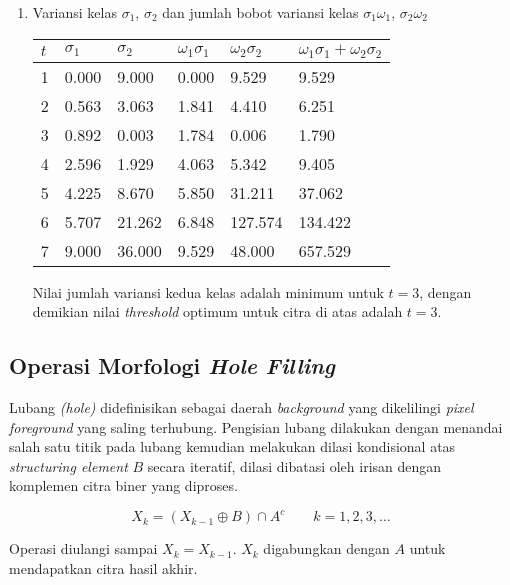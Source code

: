 \documentclass[laporan.tex]{subfiles}
\begin{document}
\begin{enumerate}
\item Variansi kelas $\sigma_1$, $\sigma_2$ dan jumlah bobot variansi kelas $\sigma_1 \omega_1$, $\sigma_2 \omega_2$ \\
\begin{tabular}{|l|l|l|l|l|l|}
\hline
$t$ & $\sigma_1$ & $\sigma_2$ & $\omega_1 \sigma_1$ & $\omega_2 \sigma_2$ & $\omega_1 \sigma_1 + \omega_2 \sigma_2$ \\
\hline
1 & 0.000 & 9.000 & 0.000 & 9.529 & 9.529 \\
2 & 0.563 & 3.063 & 1.841 & 4.410 & 6.251 \\
3 & 0.892 & 0.003 & 1.784 & 0.006 & 1.790 \\
4 & 2.596 & 1.929 & 4.063 & 5.342 & 9.405 \\
5 & 4.225 & 8.670 & 5.850 & 31.211 & 37.062 \\
6 & 5.707 & 21.262 & 6.848 & 127.574 & 134.422 \\
7 & 9.000 & 36.000 & 9.529 & 48.000 & 657.529 \\
\hline
\end{tabular}

Nilai jumlah variansi kedua kelas adalah minimum untuk $t=3$, dengan demikian nilai \emph{threshold} optimum untuk citra di atas adalah $t=3$.

\end{enumerate}

\FloatBarrier

\subsection{Operasi Morfologi \emph{Hole Filling}}

Lubang \emph{(hole)} didefinisikan sebagai daerah \emph{background} yang dikelilingi \emph{pixel} \emph{foreground} yang saling terhubung. Pengisian lubang dilakukan dengan menandai salah satu titik pada lubang kemudian melakukan dilasi kondisional atas \emph{structuring element} $B$ secara iteratif, dilasi dibatasi oleh irisan dengan komplemen citra biner yang diproses.

\begin{equation}
X_k = (X_{k-1} \oplus B) \cap A^c \qquad k=1,2,3,\ldots
\label{eq:fill}
\end{equation}

Operasi diulangi sampai $X_k = X_{k-1}$. $X_k$ digabungkan dengan $A$ untuk mendapatkan citra hasil akhir.
\end{document}
